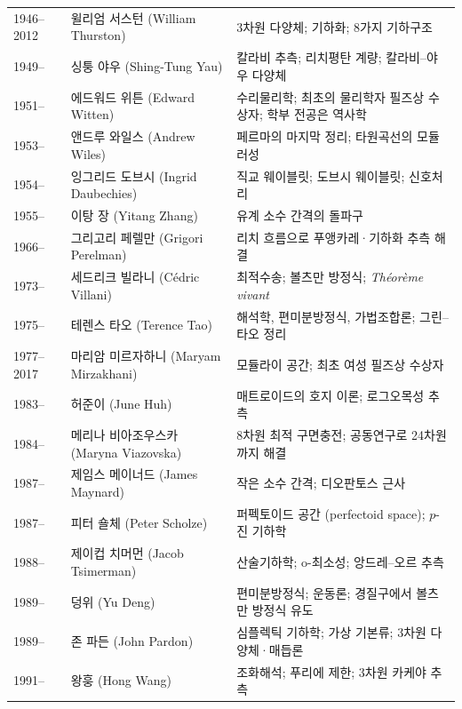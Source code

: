 \begin{center}
\begin{longtable}{@{}L{0.16\textwidth}L{0.24\textwidth}L{0.52\textwidth}@{}}
1946--2012 & 윌리엄 서스턴 (William Thurston) & 3차원 다양체; 기하화; 8가지 기하구조\\
1949-- & 싱퉁 야우 (Shing-Tung Yau) & 칼라비 추측; 리치평탄 계량; 칼라비--야우 다양체\\
1951-- & 에드워드 위튼 (Edward Witten) & 수리물리학; 최초의 물리학자 필즈상 수상자; 학부 전공은 역사학\\
1953-- & 앤드루 와일스 (Andrew Wiles) & 페르마의 마지막 정리; 타원곡선의 모듈러성\\
1954-- & 잉그리드 도브시 (Ingrid Daubechies) & 직교 웨이블릿; 도브시 웨이블릿; 신호처리\\
1955-- & 이탕 장 (Yitang Zhang) & 유계 소수 간격의 돌파구\\
1966-- & 그리고리 페렐만 (Grigori Perelman) & 리치 흐름으로 푸앵카레·기하화 추측 해결\\
1973-- & 세드리크 빌라니 (Cédric Villani) & 최적수송; 볼츠만 방정식; \textit{Théorème vivant}\\
1975-- & 테렌스 타오 (Terence Tao) & 해석학, 편미분방정식, 가법조합론; 그린--타오 정리\\
1977--2017 & 마리암 미르자하니 (Maryam Mirzakhani) & 모듈라이 공간; 최초 여성 필즈상 수상자\\
1983-- & 허준이 (June Huh) & 매트로이드의 호지 이론; 로그오목성 추측\\
1984-- & 메리나 비아조우스카 (Maryna Viazovska) & 8차원 최적 구면충전; 공동연구로 24차원까지 해결\\
1987-- & 제임스 메이너드 (James Maynard) & 작은 소수 간격; 디오판토스 근사\\
1987-- & 피터 숄체 (Peter Scholze) & 퍼펙토이드 공간 (perfectoid space); $p$-진 기하학\\
1988-- & 제이컵 치머먼 (Jacob Tsimerman) & 산술기하학; o-최소성; 앙드레--오르 추측\\
1989-- & 덩위 (Yu Deng) & 편미분방정식; 운동론; 경질구에서 볼츠만 방정식 유도\\
1989-- & 존 파든 (John Pardon) & 심플렉틱 기하학; 가상 기본류; 3차원 다양체·매듭론\\
1991-- & 왕훙 (Hong Wang) & 조화해석; 푸리에 제한; 3차원 카케야 추측\\
\end{longtable}
\end{center}


